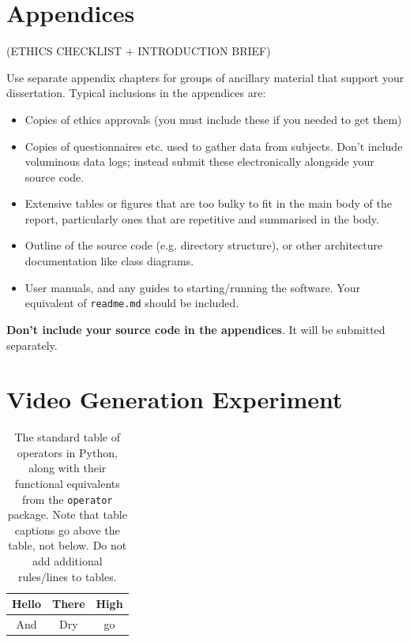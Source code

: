 \documentclass{l4proj}
\begin{document}
\begin{appendices}

\chapter{Appendices}
 (ETHICS CHECKLIST + INTRODUCTION BRIEF)
 
Use separate appendix chapters for groups of ancillary material that support your dissertation. 
Typical inclusions in the appendices are:

\begin{itemize}
\item
  Copies of ethics approvals (you must include these if you needed to get them)
\item
  Copies of questionnaires etc. used to gather data from subjects. Don't include
  voluminous data logs; instead submit these electronically alongside your source code.
\item
  Extensive tables or figures that are too bulky to fit in the main body of
  the report, particularly ones that are repetitive and summarised in the body.
\item Outline of the source code (e.g. directory structure), 
    or other architecture documentation like class diagrams.
\item User manuals, and any guides to starting/running the software. 
Your equivalent of \texttt{readme.md} should be included.

\end{itemize}

\textbf{Don't include your source code in the appendices}. It will be
submitted separately.

\chapter{Video Generation Experiment}
\begin{table}
    \centering
    \caption{The standard table of operators in Python, along with their functional equivalents from the \texttt{operator} package. Note that table
    captions go above the table, not below. Do not add additional rules/lines to tables. }\label{tab:operators}
    \begin{tabular}{| c | c | c |}
    \hline
    Hello & There & High \\
    \hline
    And & Dry & go \\
    \hline
    \end{tabular}
\end{table}

\end{appendices}





\renewcommand{\thechapter}{0} 

\end{document}
